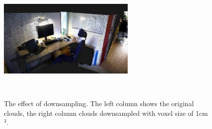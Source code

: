 \documentclass[11pt,a4paper]{kth-mag}
\begin{document}
\begin{figure}
{{      \includegraphics[width=0.60\textwidth]{images/nils_side_ds}
    }\\
  }
  \centerline{
    \\
  }
  \caption{The effect of downsampling. The left column shows the original
    clouds, the right column clouds downsampled with voxel size of 1cm$^3$.}
  \label{fig:downsample_effect}
\end{figure}
\end{document}
